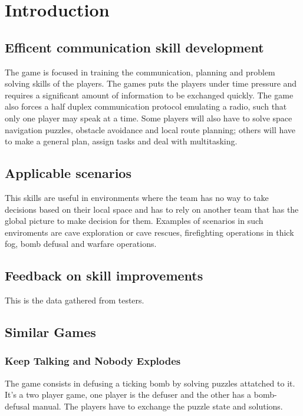 \documentclass{article}
\begin{document}
\clearpage

\tableofcontents

\clearpage

\section{Introduction}
\subsection{Efficent communication skill development}
The game is focused in training the communication, planning and problem solving skills of the players. The games puts the players under time pressure and requires a significant amount of information to be exchanged quickly. The game also forces a half duplex communication protocol emulating a radio, such that only one player may speak at a time. Some players will also have to solve space navigation puzzles, obstacle avoidance and local route planning; others will have to make a general plan, assign tasks and deal with multitasking.
\subsection{Applicable scenarios}
This skills are useful in environments where the team has no way to take decisions based on their local space and has to rely on another team that has the global picture to make decision for them. Examples of scenarios in such enviroments are cave exploration or cave rescues, firefighting operations in thick fog, bomb defusal and warfare operations. 
\subsection{Feedback on skill improvements}
This is the data gathered from testers.

\clearpage

\subsection{Similar Games}
\subsubsection{Keep Talking and Nobody Explodes}
The game consists in defusing a ticking bomb by solving puzzles attatched to it. It's a two player game, one player is the defuser and the other has a bomb-defusal manual. The players have to exchange the puzzle state and solutions. 
\end{document}
